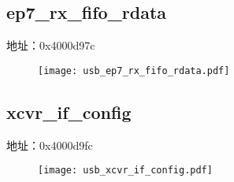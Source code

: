 \subsection{ep7\_rx\_fifo\_rdata}
\label{usb-ep7-rx-fifo-rdata}
地址：0x4000d97c
 \begin{figure}[H]
\texttt{[image: usb\_ep7\_rx\_fifo\_rdata.pdf]}
\end{figure}

\subsection{xcvr\_if\_config}
\label{usb-xcvr-if-config}
地址：0x4000d9fc
 \begin{figure}[H]
\texttt{[image: usb\_xcvr\_if\_config.pdf]}
\end{figure}

